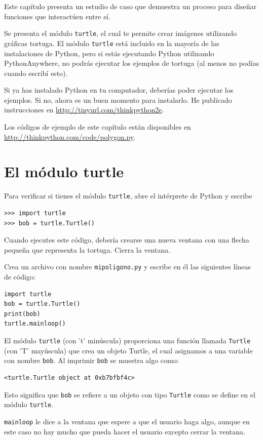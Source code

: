 \documentclass[10pt]{book}
\begin{document}
Este capítulo presenta un estudio de caso que demuestra un proceso para
diseñar funciones que interactúen entre sí.

Se presenta el módulo {\tt turtle}, el cual te permite
crear imágenes utilizando gráficas tortuga.  El módulo {\tt turtle}
está incluido en la mayoría de las instalaciones de Python, pero si estás ejecutando Python
utilizando PythonAnywhere, no podrás ejecutar los ejemplos de tortuga (al
menos no podías cuando escribí esto).

Si ya has instalado Python en tu computador, deberías
poder ejecutar los ejemplos.  Si no, ahora es un buen momento
para instalarlo.  He publicado instrucciones en
\url{http://tinyurl.com/thinkpython2e}.

Los códigos de ejemplo de este capítulo están disponibles en
\url{http://thinkpython.com/code/polygon.py}.


\section{El módulo turtle}
\label{turtle}

Para verificar si tienes el módulo {\tt turtle}, abre el intérprete de Python
y escribe

\begin{verbatim}
>>> import turtle
>>> bob = turtle.Turtle()
\end{verbatim}

Cuando ejecutes este código, debería crearse una nueva ventana
con una flecha pequeña que representa la tortuga.  Cierra la ventana.

Crea un archivo con nombre {\tt mipoligono.py} y escribe en él las siguientes
líneas de código:

\begin{verbatim}
import turtle
bob = turtle.Turtle()
print(bob)
turtle.mainloop()
\end{verbatim}
%
El módulo {\tt turtle} (con 't' minúscula) proporciona una función
llamada {\tt Turtle} (con 'T' mayúscula) que crea un objeto Turtle,
el cual asignamos a una variable con nombre {\tt bob}.
Al imprimir {\tt bob} se muestra algo como:

\begin{verbatim}
<turtle.Turtle object at 0xb7bfbf4c>
\end{verbatim}
%
Esto significa que {\tt bob} se refiere a un objeto con tipo
{\tt Turtle}
como se define en el módulo {\tt turtle}.

\verb"mainloop" le dice a la ventana que espere a que el usuario
haga algo, aunque en este caso no hay mucho que pueda hacer
el usuario excepto cerrar la ventana.
\end{document}

